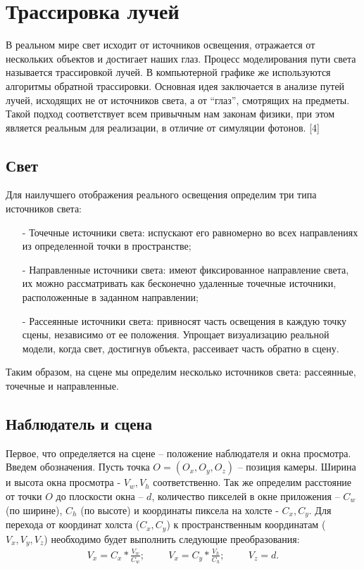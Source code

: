 \section{Трассировка лучей}

В реальном мире свет исходит от источников освещения, отражается от
нескольких объектов и достигает наших глаз. Процесс моделирования пути света называется трассировкой лучей. В компьютерной графике же используются алгоритмы обратной трассировки. Основная идея заключается в анализе путей лучей, исходящих не от источников света, а от “глаз”, смотрящих на предметы. Такой подход соответствует всем привычным нам законам физики, при этом является реальным для реализации, в отличие от симуляции фотонов. [4]

\subsection{Свет}

Для наилучшего отображения реального освещения определим три типа
источников света:
\begin{itemize}[label=\arabic*)]
	\item[-] Точечные источники света: испускают его равномерно во всех направлениях из определенной точки в пространстве;
	\item[-] Направленные источники света: имеют фиксированное направление света, их можно рассматривать как бесконечно удаленные точечные источники, расположенные в заданном направлении;
	\item[-] Рассеянные источники света: привносят часть освещения в каждую точку сцены, независимо от ее положения. Упрощает визуализацию реальной модели, когда свет, достигнув объекта, рассеивает часть обратно в сцену.
\end{itemize}

Таким образом, на сцене мы определим несколько источников света: рассеянные, точечные и направленные.

\subsection{Наблюдатель и сцена}

Первое, что определяется на сцене – положение наблюдателя и окна просмотра. Введем обозначения. Пусть точка $O = (O_{x}, O_{y}, O_{z})$ – позиция камеры. Ширина и высота окна просмотра - $V_{w}, V_{h}$ соответственно. Так же определим расстояние от точки $O$ до плоскости окна – $d$, количество пикселей в окне приложения – $C_{w}$ (по ширине), $C_{h}$ (по высоте) и координаты пиксела на холсте - $C_{x}, C_{y}$.
Для перехода от координат холста ($C_{x}, C_{y}$) к пространственным координатам ($V_{x}, V_{y}, V_{z}$) необходимо будет выполнить следующие преобразования:
\begin{gather}
	V_{x} = C_{x}*\frac{V_{w}}{C_{w}};\hspace{1cm}V_{x} = C_{y}*\frac{V_{h}}{C_{h}};\hspace{1cm}V_{z} = d.
\end{gather}

